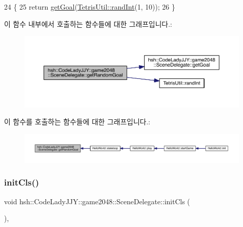 \begin{DoxyCode}
24                                                      \{
25                     \textcolor{keywordflow}{return} \hyperlink{classhsh_1_1_code_lady_j_j_y_1_1game2048_1_1_scene_delegate_a5766c3d3f2f5ee3a4c7664198f362e8f}{getGoal}(\hyperlink{class_tetris_util_a0a60e809425ddb416a500bcc03cf7061}{TetrisUtil::randInt}(1, 10));
26                 \}
\end{DoxyCode}
이 함수 내부에서 호출하는 함수들에 대한 그래프입니다.\+:
\nopagebreak
\begin{figure}[H]
\begin{center}
\leavevmode
\includegraphics[width=350pt]{d7/d4d/classhsh_1_1_code_lady_j_j_y_1_1game2048_1_1_scene_delegate_abb107cf268a50b3ebd9bd545c88a9a35_cgraph}
\end{center}
\end{figure}
이 함수를 호출하는 함수들에 대한 그래프입니다.\+:
\nopagebreak
\begin{figure}[H]
\begin{center}
\leavevmode
\includegraphics[width=350pt]{d7/d4d/classhsh_1_1_code_lady_j_j_y_1_1game2048_1_1_scene_delegate_abb107cf268a50b3ebd9bd545c88a9a35_icgraph}
\end{center}
\end{figure}
\mbox{\label{classhsh_1_1_code_lady_j_j_y_1_1game2048_1_1_scene_delegate_ab5504cff24fa2c916c0c6139aff67a4e}} 
\subsubsection{\texorpdfstring{init\+Cls()}{initCls()}}
{\footnotesize\ttfamily void hsh\+::\+Code\+Lady\+J\+J\+Y\+::game2048\+::\+Scene\+Delegate\+::init\+Cls (\begin{DoxyParamCaption}{ }\end{DoxyParamCaption})\hspace{0.3cm}{\ttfamily [inline]}, {\ttfamily [protected]}}



